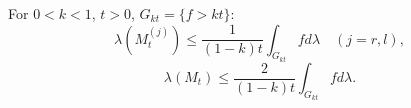 For $0 < k < 1$, $t > 0$, $G_{kt} = \{f > kt\}$:
$$\lambda(M_t^{(j)}) \leq \frac{1}{(1-k)t} \int_{G_{kt}} f d\lambda \quad (j=r,l),$$
$$\lambda(M_t) \leq \frac{2}{(1-k)t} \int_{G_{kt}} f d\lambda.$$
